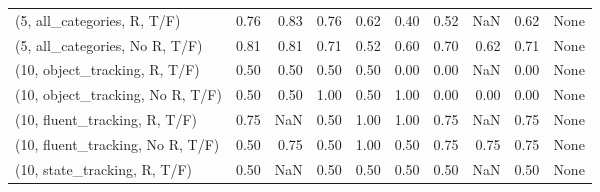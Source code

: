 \begin{table*}[h!]
\begin{adjustbox}{width=2\columnwidth,center}
\begin{tabular}{lrrr|rrr|rrr}
(5, all\_categories, R, T/F)          &                      0.76 &                  0.83 &                      0.76 &                          0.62 &                      0.40 &                          0.52 &                                    NaN &                               0.62 &                                  None \\
(5, all\_categories, No R, T/F)       &                      0.81 &                  0.81 &                      0.71 &                          0.52 &                      0.60 &                          0.70 &                                   0.62 &                               0.71 &                                  None \\



\midrule
(10, object\_tracking, R, T/F)         &                      0.50 &                  0.50 &                      0.50 &                          0.50 &                      0.00 &                          0.00 &                                    NaN &                               0.00 &                                  None \\
(10, object\_tracking, No R, T/F)      &                      0.50 &                  0.50 &                      1.00 &                          0.50 &                      1.00 &                          0.00 &                                   0.00 &                               0.00 &                                  None \\
(10, fluent\_tracking, R, T/F)         &                      0.75 &                   NaN &                      0.50 &                          1.00 &                      1.00 &                          0.75 &                                    NaN &                               0.75 &                                  None \\
(10, fluent\_tracking, No R, T/F)      &                      0.50 &                  0.75 &                      0.50 &                          1.00 &                      0.50 &                          0.75 &                                   0.75 &                               0.75 &                                  None \\
(10, state\_tracking, R, T/F)          &                      0.50 &                   NaN &                      0.50 &                          0.50 &                      0.50 &                          0.50 &                                    NaN &                               0.50 &                                  None \\

\end{tabular}
\end{adjustbox}
\end{table*}
